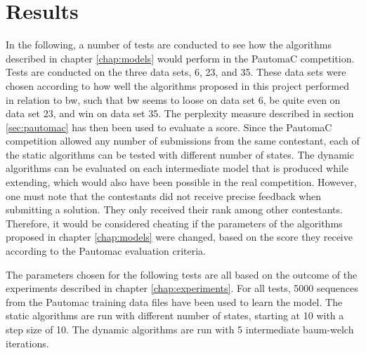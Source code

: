 \chapter{Results}
\label{chap:results}
In the following, a number of tests are conducted to see how the algorithms described in chapter \ref{chap:models} would perform in the PautomaC competition. Tests are conducted on the three data sets, 6, 23, and 35. These data sets were chosen according to how well the algorithms proposed in this project performed in relation to \gls{bw}, such that \gls{bw} seems to loose on data set 6, be quite even on data set 23, and win on data set 35.
The perplexity measure described in section \ref{sec:pautomac} has then been used to evaluate a score.
Since the PautomaC competition allowed any number of submissions from the same contestant, each of the static algorithms can be tested with different number of states. The dynamic algorithms can be evaluated on each intermediate model that is produced while extending, which would also have been possible in the real competition.
However, one must note that the contestants did not receive precise feedback when submitting a solution. They only received their rank among other contestants. Therefore, it would be considered cheating if the parameters of the algorithms proposed in chapter \ref{chap:models} were changed, based on the score they receive according to the Pautomac evaluation criteria.

The parameters chosen for the following tests are all based on the outcome of the experiments described in chapter \ref{chap:experiments}.
For all tests, 5000 sequences from the Pautomac training data files have been used to learn the model. The static algorithms are run with different number of states, starting at 10 with a step size of 10.
The dynamic algorithms are run with 5 intermediate \gls{baum-welch} iterations.